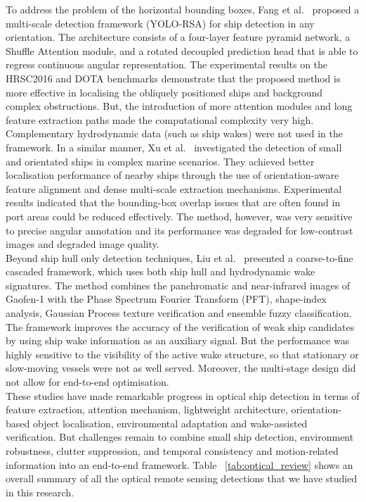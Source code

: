 To address the problem of the horizontal bounding boxes, Fang et al.~\cite{jmse12040603} proposed a multi-scale detection framework (YOLO-RSA) for ship detection in any orientation. The architecture consists of a four-layer feature pyramid network, a Shuffle Attention module, and a rotated decoupled prediction head that is able to regress continuous angular representation. The experimental results on the HRSC2016 and DOTA benchmarks demonstrate that the proposed method is more effective in localising the obliquely positioned ships and background complex obstructions. But, the introduction of more attention modules and long feature extraction paths made the computational complexity very high. Complementary hydrodynamic data (such as ship wakes) were not used in the framework.
In a similar manner, Xu et al.~\cite{xu2025robust} investigated the detection of small and orientated ships in complex marine scenarios. They achieved better localisation performance of nearby ships through the use of orientation-aware feature alignment and dense multi-scale extraction mechanisms. Experimental results indicated that the bounding-box overlap issues that are often found in port areas could be reduced effectively. The method, however, was very sensitive to precise angular annotation and its performance was degraded for low-contrast images and degraded image quality. \\


Beyond ship hull only detection techniques, Liu et al.~\cite{Liu31122023} presented a coarse-to-fine cascaded framework, which uses both ship hull and hydrodynamic wake signatures. The method combines the panchromatic and near-infrared images of Gaofen-1 with the Phase Spectrum Fourier Transform (PFT), shape-index analysis, Gaussian Process texture verification and ensemble fuzzy classification. The framework improves the accuracy of the verification of weak ship candidates by using ship wake information as an auxiliary signal. But the performance was highly sensitive to the visibility of the active wake structure, so that stationary or slow-moving vessels were not as well served. Moreover, the multi-stage design did not allow for end-to-end optimisation.\\
These studies have made remarkable progress in optical ship detection in terms of feature extraction, attention mechanism, lightweight architecture, orientation-based object localisation, environmental adaptation and wake-assisted verification. But challenges remain to combine small ship detection, environment robustness, clutter suppression, and temporal consistency and motion-related information into an end-to-end framework. Table ~\ref{tab:optical_review} shows an overall summary of all the optical remote sensing detections that we have studied in this research.


